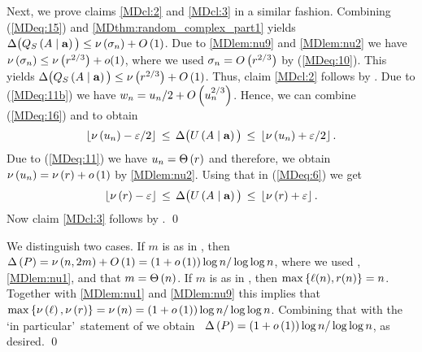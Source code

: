 Next, we prove claims \ref{MDcl:2} and \ref{MDcl:3} in a similar fashion. Combining (\ref{MDeq:15}) and \ref{MDthm:random_complex_part1} yields $\Delta\big(Q_S\left(A \mid \mathbf{a}\right)\big)\leq \nu\left(\sigma_n\right)+O\left(1\right)$. Due to \ref{MDlem:nu9} and \ref{MDlem:nu2} we have $\nu\left(\sigma_n\right)\leq\nu\left(r^{2/3}\right)+o(1)$, where we used $\sigma_n=O\left(r^{2/3}\right)$ by (\ref{MDeq:10}). This yields $\Delta\big(Q_S\left(A \mid \mathbf{a}\right)\big)\leq\nu\left(r^{2/3}\right)+O\left(1\right)$. Thus, claim \ref{MDcl:2} follows by . 
Due to (\ref{MDeq:11b}) we have $w_n=u_n/2+O\left(u_n^{2/3}\right)$. Hence, we can combine (\ref{MDeq:16}) and  to obtain \whp
\begin{align}\label{MDeq:6}
\left\lfloor\nu\left(u_n\right)-\varepsilon/2\right\rfloor\hspace{0.06cm}\leq\hspace{0.06cm} \Delta\big(U\left(A \mid \mathbf{a}\right)\big)\hspace{0.06cm}\leq\hspace{0.06cm} \left\lfloor\nu\left(u_n\right)+\varepsilon/2\right\rfloor.
\end{align}
Due to (\ref{MDeq:11}) we have $u_n=\Theta\left(r\right)$ and therefore, we obtain $\nu\left(u_n\right)=\nu\left(r\right)+o\left(1\right)$ by \ref{MDlem:nu2}. Using that in (\ref{MDeq:6}) we get \whp
 \begin{align*}
 \left\lfloor\nu\left(r\right)-\varepsilon\right\rfloor\hspace{0.06cm}\leq\hspace{0.06cm} \Delta\big(U\left(A \mid \mathbf{a}\right)\big)\hspace{0.06cm}\leq\hspace{0.06cm} \left\lfloor\nu\left(r\right)+\varepsilon\right\rfloor.
 \end{align*}
 Now claim \ref{MDcl:3} follows by . \qed

We distinguish two cases. If $m$ is as in , then \whp\ $\Delta\left(P\right)=\nu\left(n, 2m\right)+O\left(1\right)=\left(1+o\left(1\right)\right)\log n/\log\log n$, where we used , \ref{MDlem:nu1}, and that $m=\Theta\left(n\right)$. If $m$ is as in , then $\max\left\{\ell(n),r(n)\right\}=n$. Together with \ref{MDlem:nu1} and \ref{MDlem:nu9} this implies that $\max\left\{\nu\left(\ell\right),\nu\left(r\right)\right\}=\nu\left(n\right)=\left(1+o\left(1\right)\right)\log n/\log\log n$. Combining that with the \lq in particular\rq\ statement of  we obtain \whp\ $\Delta\left(P\right)=\left(1+o\left(1\right)\right)\log n/\log\log n$, as desired.
\qed

